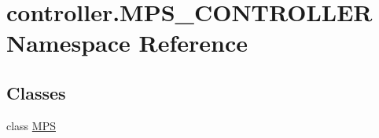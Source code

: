\hypertarget{namespacecontroller_1_1MPS__CONTROLLER}{}\section{controller.\+M\+P\+S\+\_\+\+C\+O\+N\+T\+R\+O\+L\+L\+E\+R Namespace Reference}
\label{namespacecontroller_1_1MPS__CONTROLLER}
\subsection*{Classes}
\begin{DoxyCompactItemize}
\item 
class \hyperlink{classcontroller_1_1MPS__CONTROLLER_1_1MPS}{M\+P\+S}
\end{DoxyCompactItemize}
